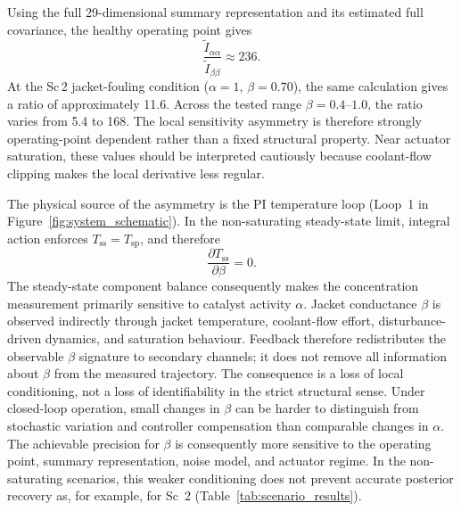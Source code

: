 \documentclass[aps,pre,twocolumn,superscriptaddress,floatfix]{revtex4-2}
\begin{document}
Using the full 29-dimensional summary representation and its estimated full covariance, the healthy operating point gives
\begin{equation}
  \frac{\widetilde I_{\alpha\alpha}}{\widetilde I_{\beta\beta}}
  \approx 236.
  \label{eq:fim_ratio}
\end{equation}
At the Sc\,2 jacket-fouling condition ($\alpha=1$, $\beta=0.70$), the same calculation gives a 
ratio of approximately 11.6. Across the tested range $\beta=0.4$--$1.0$, the ratio varies 
from 5.4 to 168. The local sensitivity asymmetry is therefore strongly operating-point dependent 
rather than a fixed structural property. Near actuator saturation, these values should be interpreted 
cautiously because coolant-flow clipping makes the local derivative less regular.

The physical source of the asymmetry is the PI temperature loop (Loop~1 in Figure~\ref{fig:system_schematic}). 
In the non-saturating steady-state limit, integral action enforces $T_{\mathrm{ss}}=T_{\mathrm{sp}}$, and therefore
\begin{equation}
  \frac{\partial T_{\mathrm{ss}}}{\partial\beta}=0.
\end{equation}
The steady-state component balance consequently makes the concentration measurement 
primarily sensitive to catalyst activity $\alpha$. Jacket conductance $\beta$ is observed 
indirectly through jacket temperature, coolant-flow effort, disturbance-driven dynamics, 
and saturation behaviour. Feedback therefore redistributes the observable $\beta$ signature 
to secondary channels; it does not remove all information about $\beta$ from the measured trajectory.
The consequence is a loss of local conditioning, not a loss of identifiability in the strict
structural sense. Under closed-loop operation, small changes in $\beta$ can be harder to distinguish
from stochastic variation and controller compensation than comparable changes in $\alpha$. 
The achievable precision for $\beta$ is consequently more sensitive to the operating point, 
summary representation, noise model, and actuator regime. In the non-saturating scenarios, this 
weaker conditioning does not prevent accurate posterior recovery as, for example, for Sc~2
 (Table~\ref{tab:scenario_results}).
\end{document}
